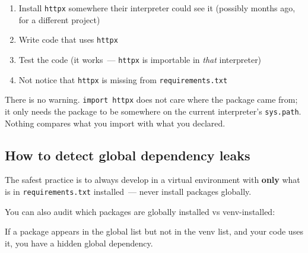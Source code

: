 \begin{enumerate}
\def\labelenumi{\arabic{enumi}.}
\tightlist
\item
  Install \texttt{httpx} somewhere their interpreter could see it (possibly months ago, for a different project)
\item
  Write code that uses \texttt{httpx}
\item
  Test the code (it works~--- \texttt{httpx} is importable in \emph{that} interpreter)
\item
  Not notice that \texttt{httpx} is missing from \texttt{requirements.txt}
\end{enumerate}

\noindent{}There is no warning. \texttt{import\ httpx} does not care where the package came from; it only needs the package to be somewhere on the current interpreter's \texttt{sys.path}. Nothing compares what you import with what you declared.

\subsection*{How to detect global dependency leaks}\label{08-hidden-dependencies:how-to-detect-global-dependency-leaks}

The safest practice is to always develop in a virtual environment with \textbf{only} what is in \texttt{requirements.txt} installed~--- never install packages globally.

You can also audit which packages are globally installed vs venv-installed:

\begin{codebox}[short]

\begin{Shaded}
\begin{Highlighting}[]

\end{Highlighting}
\end{Shaded}

\end{codebox}

\noindent{}If a package appears in the global list but not in the venv list, and your code uses it, you have a hidden global dependency.

